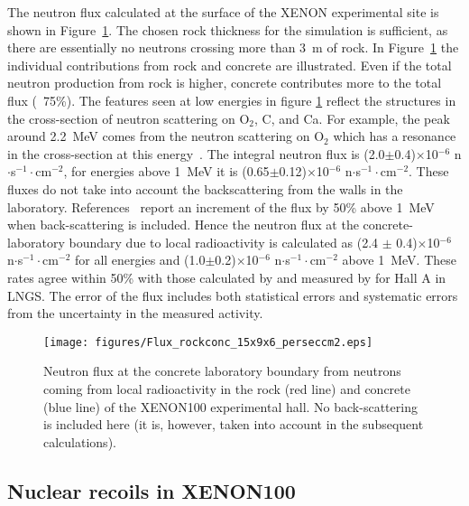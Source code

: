 The neutron flux calculated at the surface of the XENON experimental site is shown in Figure~\ref{rock-flux}. 
The chosen rock thickness for the simulation is sufficient, as there are
essentially no neutrons crossing more than 3~m of rock. 
In Figure~\ref{rock-flux} the individual contributions from rock and concrete 
are illustrated. Even 
if the total neutron production from rock is higher, concrete
contributes more to the total flux (~75\%).  
The features seen at low energies in figure \ref{rock-flux}  
reflect the structures in the cross-section of neutron scattering on O$_2$, C, and Ca. For example, the peak around 2.2~MeV comes from the neutron scattering
on O$_2$ which has a resonance in the cross-section at this energy~\cite{n-cross-section}. 
The integral neutron flux is (2.0$\pm$0.4)$\times$10$^{-6}$
 n$\cdot$s$^{-1}\cdot$cm$^{-2}$, for energies above 1~MeV it is (0.65$\pm$0.12)$\times$10$^{-6}$  n$\cdot$s$^{-1}\cdot$cm$^{-2}$.
These fluxes do not take into account the backscattering from the walls in the laboratory.
References~\cite{lemrani, tziaferi} report an increment of the flux by 50\% above 1~MeV when
back-scattering is included. Hence the neutron flux at the concrete-laboratory
boundary due to local radioactivity is calculated as (2.4 $\pm$ 0.4)$\times$10$^{-6}$
 n$\cdot$s$^{-1}\cdot$cm$^{-2}$ for all energies and (1.0$\pm$0.2)$\times$10$^{-6}$  n$\cdot$s$^{-1}\cdot$cm$^{-2}$ above 1~MeV.  
These rates agree within 50\% with those calculated by \cite{wulandari} and measured by \cite{measured-flux} for Hall A in LNGS.
The error of the flux includes both statistical errors and systematic errors from the
uncertainty in the measured activity.

\begin{figure}[h!]
\begin{center}
 \texttt{[image: figures/Flux\_rockconc\_15x9x6\_perseccm2.eps]}
\caption{Neutron flux at the concrete laboratory boundary from neutrons
  coming from local radioactivity in the rock (red line) and concrete (blue
  line) of the XENON100 experimental hall. No back-scattering is included here
  (it is, however, taken into account in the subsequent calculations).}
\label{rock-flux}
\end{center}
\end{figure}
 
\subsection{Nuclear recoils in XENON100}

